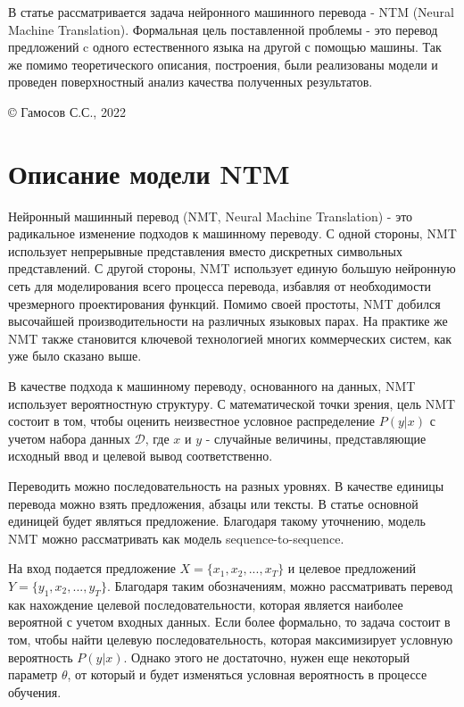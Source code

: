 \documentclass[a4paper,12pt]{article}
\begin{document}
	В статье рассматривается задача нейронного машинного перевода - NTM (Neural Machine Translation). Формальная цель поставленной проблемы - это перевод предложений c одного естественного языка на другой с помощью машины. Так же помимо теоретического описания, построения, были реализованы модели и проведен поверхностный анализ качества полученных результатов.
	
	\hfill
	
	{\footnotesize © Гамосов С.С., 2022}
	
	\clearpage
	
	\section*{Описание модели NTM}
	    
	Нейронный машинный перевод (NMT, Neural Machine Translation) - это радикальное изменение подходов к машинному переводу. С одной стороны, NMT использует непрерывные представления вместо дискретных символьных представлений. С другой стороны, NMT использует единую большую нейронную сеть для моделирования всего процесса перевода, избавляя от необходимости чрезмерного проектирования функций. Помимо своей простоты, NMT добился высочайшей производительности на различных языковых парах. На практике же NMT также становится ключевой технологией многих коммерческих систем, как уже было сказано выше.
	
	В качестве подхода к машинному переводу, основанного на данных, NMT использует вероятностную структуру. С математической точки зрения, цель NMT состоит в том, чтобы оценить неизвестное условное распределение $P(y|x)$ с учетом набора данных $\mathcal{D}$, где $x$ и $y$ - случайные величины, представляющие исходный ввод и целевой вывод соответственно.
	
    Переводить можно последовательность на разных уровнях. В качестве единицы перевода можно взять предложения, абзацы или тексты. В статье основной единицей будет являться предложение. Благодаря такому уточнению, модель NMT можно рассматривать как модель sequence-to-sequence. 
    
    На вход подается предложение $X = \{x_1, x_2, ... , x_T\}$ и целевое предложений $Y = \{y_1, x_2, ... , y_T\}$. Благодаря таким обозначениям, можно рассматривать перевод как нахождение целевой последовательности, которая является наиболее вероятной с учетом входных данных. Если более формально, то задача состоит в том, чтобы найти целевую последовательность, которая максимизирует условную вероятность $P(y|x)$. Однако этого не достаточно, нужен еще некоторый параметр $\theta$, от который и будет изменяться условная вероятность в процессе обучения. 
    
\end{document}
